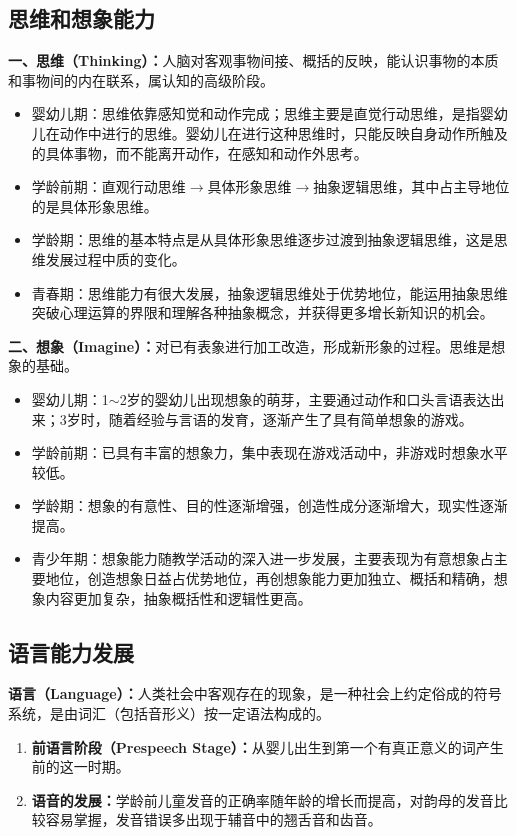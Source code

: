 \subsection{思维和想象能力}

\begin{keybox}
\textbf{一、思维（Thinking）：}人脑对客观事物间接、概括的反映，能认识事物的本质和事物间的内在联系，属认知的高级阶段。

\begin{itemize}[leftmargin=*]
    \item 婴幼儿期：思维依靠感知觉和动作完成；思维主要是直觉行动思维，是指婴幼儿在动作中进行的思维。婴幼儿在进行这种思维时，只能反映自身动作所触及的具体事物，而不能离开动作，在感知和动作外思考。
    \item 学龄前期：直观行动思维$\to$具体形象思维$\to$抽象逻辑思维，其中占主导地位的是具体形象思维。
    \item 学龄期：思维的基本特点是从具体形象思维逐步过渡到抽象逻辑思维，这是思维发展过程中质的变化。
    \item 青春期：思维能力有很大发展，抽象逻辑思维处于优势地位，能运用抽象思维突破心理运算的界限和理解各种抽象概念，并获得更多增长新知识的机会。
\end{itemize}

\textbf{二、想象（Imagine）：}对已有表象进行加工改造，形成新形象的过程。思维是想象的基础。

\begin{itemize}[leftmargin=*]
    \item 婴幼儿期：1$\sim$2岁的婴幼儿出现想象的萌芽，主要通过动作和口头言语表达出来；3岁时，随着经验与言语的发育，逐渐产生了具有简单想象的游戏。
    \item 学龄前期：已具有丰富的想象力，集中表现在游戏活动中，非游戏时想象水平较低。
    \item 学龄期：想象的有意性、目的性逐渐增强，创造性成分逐渐增大，现实性逐渐提高。
    \item 青少年期：想象能力随教学活动的深入进一步发展，主要表现为有意想象占主要地位，创造想象日益占优势地位，再创想象能力更加独立、概括和精确，想象内容更加复杂，抽象概括性和逻辑性更高。
\end{itemize}
\end{keybox}

\subsection{语言能力发展}

\begin{keybox}
\textbf{语言（Language）：}人类社会中客观存在的现象，是一种社会上约定俗成的符号系统，是由词汇（包括音形义）按一定语法构成的。

\begin{enumerate}[leftmargin=*]
    \item \textbf{前语言阶段（Prespeech Stage）：}从婴儿出生到第一个有真正意义的词产生前的这一时期。
    \item \textbf{语音的发展：}学龄前儿童发音的正确率随年龄的增长而提高，对韵母的发音比较容易掌握，发音错误多出现于辅音中的翘舌音和齿音。
\end{enumerate}
\end{keybox}

